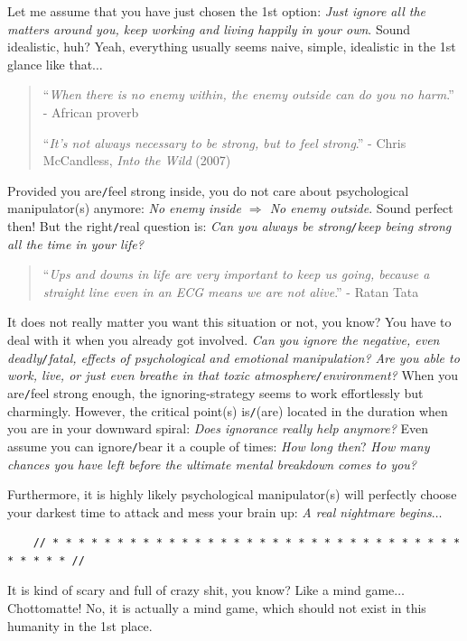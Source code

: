 \documentclass[12pt]{article}
\numberwithin{equation}{section}
\begin{document}
Let me assume that you have just chosen the 1st option: \textit{Just ignore all the matters around you, keep working and living happily in your own}. Sound idealistic, huh? Yeah, everything usually seems naive, simple, idealistic in the 1st glance like that$\ldots$
\begin{quotation}
    ``\textit{When there is no enemy within, the enemy outside can do you no harm}.'' - African proverb
    
    ``\textit{It's not always necessary to be strong, but to feel strong}.'' - Chris McCandless, \textit{Into the Wild} (2007)
\end{quotation}
Provided you are\texttt{/}feel strong inside, you do not care about psychological manipulator(s) anymore: \textit{No enemy inside $\Rightarrow$ No enemy outside}. Sound perfect then! But the right\texttt{/}real question is: \textit{Can you always be strong\texttt{/}keep being strong all the time in your life?}
\begin{quotation}
    ``\textit{Ups and downs in life are very important to keep us going, because a straight line even in an ECG means we are not alive}.'' - Ratan Tata
\end{quotation}
It does not really matter you want this situation or not, you know? You have to deal with it when you already got involved. \textit{Can you ignore the negative, even deadly\texttt{/}fatal, effects of psychological and emotional manipulation? Are you able to work, live, or just even breathe in that toxic atmosphere\texttt{/}environment?} When you are\texttt{/}feel strong enough, the ignoring-strategy seems to work effortlessly but charmingly. However, the critical point(s) is\texttt{/}(are) located in the duration when you are in your downward spiral: \textit{Does ignorance really help anymore?} Even assume you can ignore\texttt{/}bear it a couple of times: \textit{How long then}? \textit{How many chances you have left before the ultimate mental breakdown comes to you?}

Furthermore, it is highly likely psychological manipulator(s) will perfectly choose your darkest time to attack and mess your brain up: \textit{A real nightmare begins}$\ldots$

\begin{verbatim}
    // * * * * * * * * * * * * * * * * * * * * * * * * * * * * * * * * * * * * * //
\end{verbatim}

\noindent
{} It is kind of scary and full of crazy shit, you know? Like a mind game$\ldots$ Chottomatte! No, it is actually a mind game, which should not exist in this humanity in the 1st place.
\end{document}
